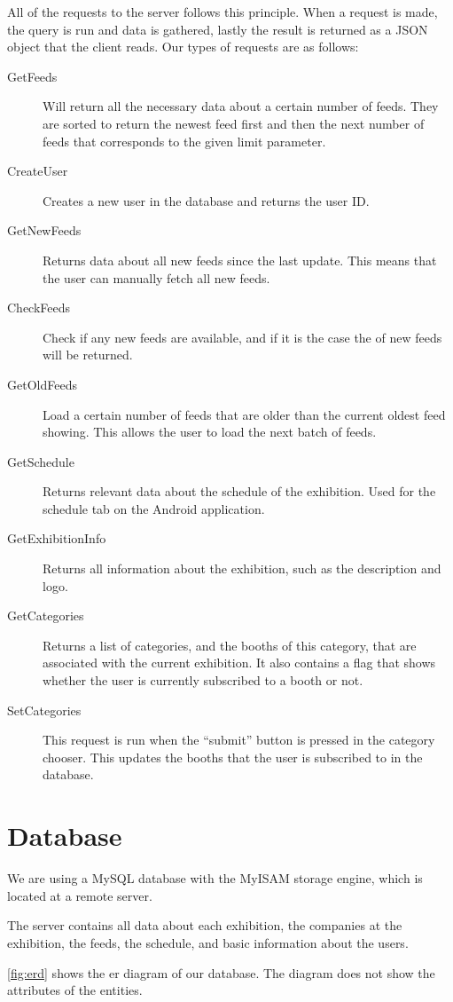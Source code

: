 All of the requests to the server follows this principle. When a request is made, the query is run and data is gathered, lastly the result is returned as a JSON object that the client reads. Our types of requests are as follows:
\begin{description}
\item[GetFeeds] Will return all the necessary data about a certain number of feeds. They are sorted to return the newest feed first and then the next number of feeds that corresponds to the given limit parameter.
\item[CreateUser] Creates a new user in the database and returns the user ID.
\item[GetNewFeeds] Returns data about all new feeds since the last update. This means that the user can manually fetch all new feeds.
\item[CheckFeeds] Check if any new feeds are available, and if it is the case the of new feeds will be returned.
\item[GetOldFeeds] Load a certain number of feeds that are older than the current oldest feed showing. This allows the user to load the next batch of feeds.
\item[GetSchedule] Returns relevant data about the schedule of the exhibition. Used for the schedule tab on the Android application.
\item[GetExhibitionInfo] Returns all information about the exhibition, such as the description and logo.
\item[GetCategories] Returns a list of categories, and the booths of this category, that are associated with the current exhibition. It also contains a flag that shows whether the user is currently subscribed to a booth or not.
\item[SetCategories] This request is run when the ``submit'' button is pressed in the category chooser. This updates the booths that the user is subscribed to in the database.
\end{description}

\section{Database}
We are using a MySQL database with the MyISAM storage engine, which is located at a remote server.

The server contains all data about each exhibition, the companies at the exhibition, the feeds, the schedule, and basic information about the users.

\autoref{fig:erd} shows the \ac{er} diagram of our database. The diagram does not show the attributes of the entities.

